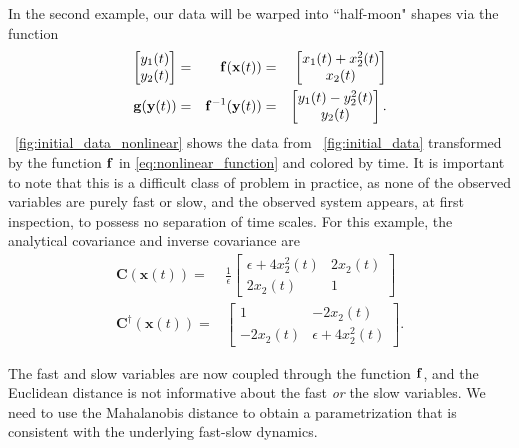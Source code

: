 In the second example, our data will be warped into ``half-moon" shapes via the function
\begin{equation} \label{eq:nonlinear_function}
\begin{aligned}
\begin{bmatrix}
y_1(t) \\ y_2(t)
\end{bmatrix} &=&
\mathbf{f}(\mathbf{x}(t)) &=&
\begin{bmatrix}
x_1(t) + x_2^2(t) \\
x_2(t)
\end{bmatrix}\\
\mathbf{g}(\mathbf{y}(t)) &=& \mathbf{f}^{-1} (\mathbf{y}(t)) &=& \begin{bmatrix} y_1(t) - y_2^2(t) \\ y_2(t) \end{bmatrix} .
\end{aligned}
\end{equation}
%
\fig~\ref{fig:initial_data_nonlinear} shows the data from \fig~\ref{fig:initial_data} transformed by the function $\mathbf{f}$ in \eqref{eq:nonlinear_function} and colored by time.
%
It is important to note that this is a difficult class of problem in practice, as none of the observed
variables are purely fast or slow, and the observed system appears, at first inspection, to possess no separation
of time scales.
%
For this example, the analytical covariance and inverse covariance are
\begin{equation}
\begin{aligned}
\mathbf{C}(\mathbf{x}(t)) =&
\frac{1}{\epsilon}
 \begin{bmatrix}
\epsilon + 4x_2^2(t) & 2x_2(t) \\
2x_2(t) & 1
\end{bmatrix}\\
\mathbf{C}^{\dagger}(\mathbf{x}(t)) =&
\begin{bmatrix}
1 & -2 x_2(t) \\
-2 x_2(t) & \epsilon+ 4 x_2^2(t)
\end{bmatrix} .
\end{aligned}
\end{equation}

The fast and slow variables are now coupled through the function $\mathbf{f}$, and the Euclidean distance is not informative about the fast {\em or} the slow variables.
%
We need to use the Mahalanobis distance to obtain a parametrization that is consistent with the underlying fast-slow dynamics.

